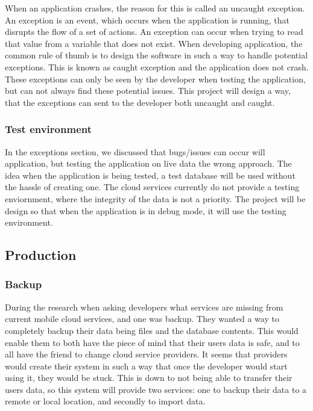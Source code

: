 When an application crashes, the reason for this is called an uncaught exception. An exception is an event, which occurs when the application is running, that disrupts the flow of a set of actions. An exception can occur when trying to read that value from a variable that does not exist. When developing application, the common rule of thumb is to design the software in such a way to handle potential exceptions. This is known as caught exception and the application does not crash. These exceptions can only be seen by the developer when testing the application, but can not always find these potential issues. This project will design a way, that the exceptions can sent to the developer both uncaught and caught.

\subsubsection{Test environment}

In the exceptions section, we discussed that bugs/issues can occur will application, but testing the application on live data the wrong approach. The idea when the application is being tested, a test database will be used without the hassle of creating one. The cloud services currently do not provide a testing enviornment, where the integrity of the data is not a priority. The project will be design so that when the application is in debug mode, it will use the testing environment. 

\subsection{Production}

\subsubsection{Backup}

During the research when asking developers what services are missing from current mobile cloud services, and one was backup. They wanted a way to completely backup their data being files and the database contents. This would enable them to both have the piece of mind that their users data is safe, and to all have the friend to change cloud service providers. It seems that providers would create their system in such a way that once the developer would start using it, they would be stuck. This is down to not being able to transfer their users data, so this system will provide two services: one to backup their data to a remote or local location, and secondly to import data.

